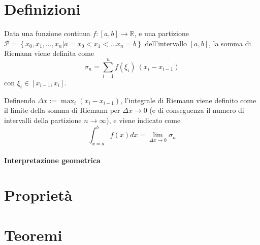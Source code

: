 \section{Definizioni}
\begin{definition} Data una funzione continua $f:[a,b] \rightarrow \mathbb{R}$, e una partizione $\mathcal{P} = \left\{x_0, x_1, \dots, x_n | a = x_0 < x_1 < \dots x_n = b \right\}$ dell'intervallo $[a,b]$, la somma di Riemann viene definita come
    \begin{equation}
        \sigma_n = \sum_{i=1}^{n} f(\xi_i) \ (x_{i} - x_{i-1})
    \end{equation}
con $\xi_i \in [x_{i-1}, x_i]$.
\end{definition}

\begin{definition} Definendo $\Delta x := \max_i(x_i - x_{i-1}) $, l'integrale di Riemann viene definito come il limite della somma di Riemann per $\Delta x  \rightarrow 0$ (e di conseguenza il numero di intervalli della partizione $n \rightarrow \infty$), e viene indicato come
    \begin{equation}
        \int_{x=a}^b f(x) dx = \lim_{\Delta x \rightarrow 0} \sigma_n
    \end{equation}
\end{definition}

\begin{definition}
\end{definition}

\paragraph{Interpretazione geometrica}

\begin{definition}
\end{definition}

\section{Proprietà}

\section{Teoremi}
\begin{theorem}
\end{theorem}

